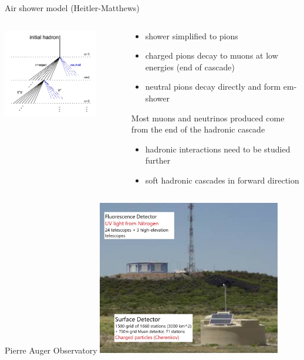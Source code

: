 \documentclass[aspectratio=1610, 9pt]{beamer}
\begin{document}
\begin{frame}{Air shower model (Heitler-Matthews)}
  \begin{columns}
    \begin{column}[c]{0.48\textwidth}
      \includegraphics[width=0.8\textwidth]{HM_model.png}
    \end{column}
    \begin{column}[c]{0.48\textwidth}
      \begin{itemize}
        \item shower simplified to pions
        \item charged pions decay to muons at low energies (end of cascade)
        \item neutral pions decay directly and form em-shower
      \end{itemize}
      Most muons and neutrinos produced come from the end of the hadronic cascade
      \begin{itemize}
        \item hadronic interactions need to be studied further
        \item soft hadronic cascades in forward direction
      \end{itemize}
    \end{column}
  \end{columns}
\end{frame}

\begin{frame}{Pierre Auger Observatory}
  \includegraphics[width=0.6\textwidth]{auger_both.jpg}
\end{frame}
\end{document}
